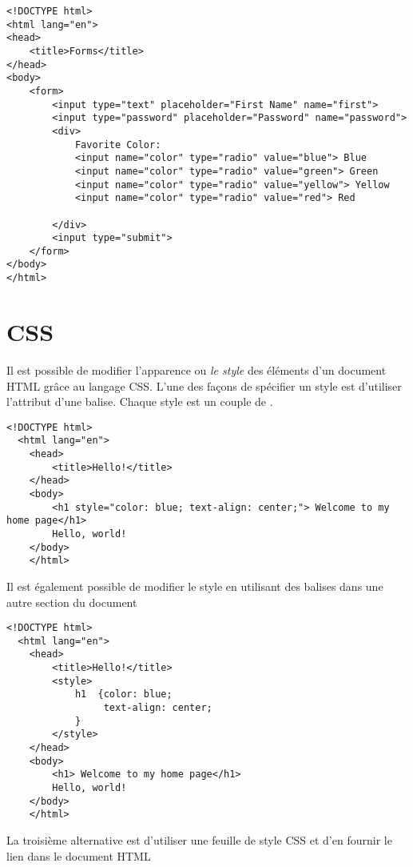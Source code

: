 \documentclass{report}
\begin{document}
\begin{ExampleDdHTML*}{}{}
  \begin{lstlisting}[style=HTMLDraculaDark]  
<!DOCTYPE html>
<html lang="en">
<head>
    <title>Forms</title>
</head>
<body>
    <form>
        <input type="text" placeholder="First Name" name="first">
        <input type="password" placeholder="Password" name="password">
        <div>
            Favorite Color:
            <input name="color" type="radio" value="blue"> Blue
            <input name="color" type="radio" value="green"> Green
            <input name="color" type="radio" value="yellow"> Yellow
            <input name="color" type="radio" value="red"> Red

        </div>
        <input type="submit">
    </form>
</body>
</html>	 
  \end{lstlisting}
\end{ExampleDdHTML*}
% 

\chapter{CSS}
\noindent Il est possible de modifier l'apparence ou \textit{le style} des éléments d'un document HTML grâce au langage CSS. L'une des façons de spécifier un style est d'utiliser l'attribut  d'une balise. Chaque style est un couple de . 



\begin{ExampleDdHTML*}{}{}
  \begin{lstlisting}[style=HTMLDraculaDark]  
  <!DOCTYPE html>
  <html lang="en">
	<head>
		<title>Hello!</title>
	</head>
	<body>
		<h1 style="color: blue; text-align: center;"> Welcome to my home page</h1>
		Hello, world!
	</body>
	</html>
  \end{lstlisting}
\end{ExampleDdHTML*}
\noindent Il est également possible de modifier le style en utilisant des balises 
 dans une autre section du document


\begin{ExampleDdHTML*}{}{}
  \begin{lstlisting}[style=HTMLDraculaDark]  
  <!DOCTYPE html>
  <html lang="en">
	<head>
		<title>Hello!</title>
		<style>
			h1	{color: blue;
				 text-align: center;
			}
		</style>
	</head>
	<body>
		<h1> Welcome to my home page</h1>
		Hello, world!
	</body>
	</html>
  \end{lstlisting}
\end{ExampleDdHTML*}
La troisième alternative est d'utiliser une feuille de style CSS et d'en fournir le lien dans le document HTML
\end{document}
